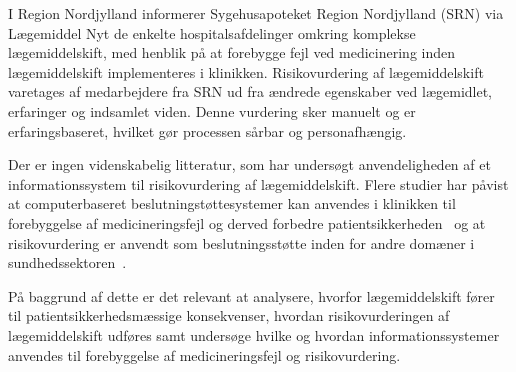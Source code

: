 I Region Nordjylland informerer Sygehusapoteket Region Nordjylland (SRN) via Lægemiddel Nyt de enkelte hospitalsafdelinger omkring komplekse lægemiddelskift, med henblik på at forebygge fejl ved medicinering inden lægemiddelskift implementeres i klinikken. Risikovurdering af lægemiddelskift varetages af medarbejdere fra SRN ud fra ændrede egenskaber ved lægemidlet, erfaringer og indsamlet viden. Denne vurdering sker manuelt og er erfaringsbaseret, hvilket gør processen sårbar og personafhængig.

Der er ingen videnskabelig litteratur, som har undersøgt anvendeligheden af et informationssystem til risikovurdering af lægemiddelskift. 
Flere studier har påvist at computerbaseret beslutningstøttesystemer kan anvendes i klinikken til forebyggelse af medicineringsfejl og derved forbedre patientsikkerheden~\citep{Agrawal2009, Stenner2010, Fischer2008, Simpson2008} og at risikovurdering er anvendt som beslutningsstøtte inden for andre domæner i sundhedssektoren~\citep{Geissert2018, Rawshani2018}. 

På baggrund af dette er det relevant at analysere, hvorfor lægemiddelskift fører til patientsikkerhedsmæssige konsekvenser, hvordan risikovurderingen af lægemiddelskift udføres samt undersøge hvilke og hvordan informationssystemer anvendes til forebyggelse af medicineringsfejl og risikovurdering.
